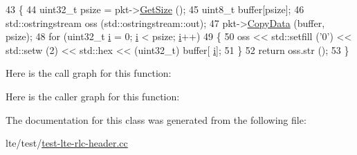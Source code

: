 \begin{DoxyCode}
43   \{
44     uint32\_t psize = pkt->\hyperlink{classns3_1_1Packet_a462855c9929954d4301a4edfe55f4f1c}{GetSize} ();
45     uint8\_t buffer[psize];
46     std::ostringstream oss (std::ostringstream::out);
47     pkt->\hyperlink{classns3_1_1Packet_a5a6d304b9e0d90733919ffe224b98f0d}{CopyData} (buffer, psize);
48     \textcolor{keywordflow}{for} (uint32\_t \hyperlink{bernuolliDistribution_8m_a6f6ccfcf58b31cb6412107d9d5281426}{i} = 0; \hyperlink{bernuolliDistribution_8m_a6f6ccfcf58b31cb6412107d9d5281426}{i} < psize; \hyperlink{bernuolliDistribution_8m_a6f6ccfcf58b31cb6412107d9d5281426}{i}++)
49       \{
50         oss << std::setfill (\textcolor{charliteral}{'0'}) << std::setw (2) << std::hex << (uint32\_t) buffer[
      \hyperlink{bernuolliDistribution_8m_a6f6ccfcf58b31cb6412107d9d5281426}{i}];
51       \}
52     \textcolor{keywordflow}{return} oss.str ();
53   \}
\end{DoxyCode}


Here is the call graph for this function\+:




Here is the caller graph for this function\+:




The documentation for this class was generated from the following file\+:\begin{DoxyCompactItemize}
\item 
lte/test/\hyperlink{test-lte-rlc-header_8cc}{test-\/lte-\/rlc-\/header.\+cc}\end{DoxyCompactItemize}
